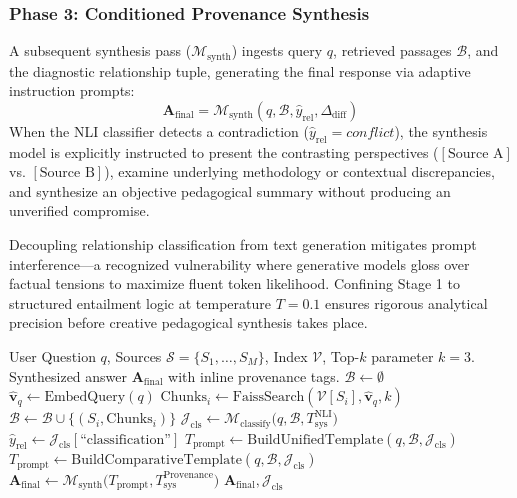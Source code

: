 \documentclass[conference]{IEEEtran}
\begin{document}
\subsubsection{Phase 3: Conditioned Provenance Synthesis}
A subsequent synthesis pass ($\mathcal{M}_{\text{synth}}$) ingests query $q$, retrieved passages $\mathcal{B}$, and the diagnostic relationship tuple, generating the final response via adaptive instruction prompts:
\begin{equation}
\mathbf{A}_{\text{final}} = \mathcal{M}_{\text{synth}}\left( q, \mathcal{B}, \hat{y}_{\text{rel}}, \Delta_{\text{diff}} \right)
\end{equation}
When the NLI classifier detects a contradiction ($\hat{y}_{\text{rel}} = \textit{conflict}$), the synthesis model is explicitly instructed to present the contrasting perspectives ($[\text{Source A}]$ vs. $[\text{Source B}]$), examine underlying methodology or contextual discrepancies, and synthesize an objective pedagogical summary without producing an unverified compromise.

Decoupling relationship classification from text generation mitigates prompt interference—a recognized vulnerability where generative models gloss over factual tensions to maximize fluent token likelihood. Confining Stage 1 to structured entailment logic at temperature $T=0.1$ ensures rigorous analytical precision before creative pedagogical synthesis takes place.

\begin{algorithm}[t]
\caption{Multi-Source Conflict Detection and Synthesis}
\label{alg:tutor}
\begin{algorithmic}[1]
\REQUIRE User Question $q$, Sources $\mathcal{S} = \{S_1, \dots, S_M\}$, Index $\mathcal{V}$, Top-$k$ parameter $k=3$.
\ENSURE Synthesized answer $\mathbf{A}_{\text{final}}$ with inline provenance tags.
\STATE $\mathcal{B} \leftarrow \emptyset$
    \STATE $\mathbf{\hat{v}}_q \leftarrow \text{EmbedQuery}(q)$
    \STATE $\text{Chunks}_i \leftarrow \text{FaissSearch}(\mathcal{V}[S_i], \mathbf{\hat{v}}_q, k)$
    \STATE $\mathcal{B} \leftarrow \mathcal{B} \cup \{ (S_i, \text{Chunks}_i) \}$
\ENDFOR
\STATE $\mathcal{J}_{\text{cls}} \leftarrow \mathcal{M}_{\text{classify}}\Big(q, \mathcal{B}, T_{\text{sys}}^{\text{NLI}}\Big)$
\STATE $\hat{y}_{\text{rel}} \leftarrow \mathcal{J}_{\text{cls}}[\text{``classification''}]$
    \STATE $T_{\text{prompt}} \leftarrow \text{BuildUnifiedTemplate}(q, \mathcal{B}, \mathcal{J}_{\text{cls}})$
\ELSE
    \STATE $T_{\text{prompt}} \leftarrow \text{BuildComparativeTemplate}(q, \mathcal{B}, \mathcal{J}_{\text{cls}})$
\ENDIF
\STATE $\mathbf{A}_{\text{final}} \leftarrow \mathcal{M}_{\text{synth}}\Big(T_{\text{prompt}}, T_{\text{sys}}^{\text{Provenance}}\Big)$
\RETURN $\mathbf{A}_{\text{final}}, \mathcal{J}_{\text{cls}}$
\end{algorithmic}
\end{algorithm}
\end{document}
